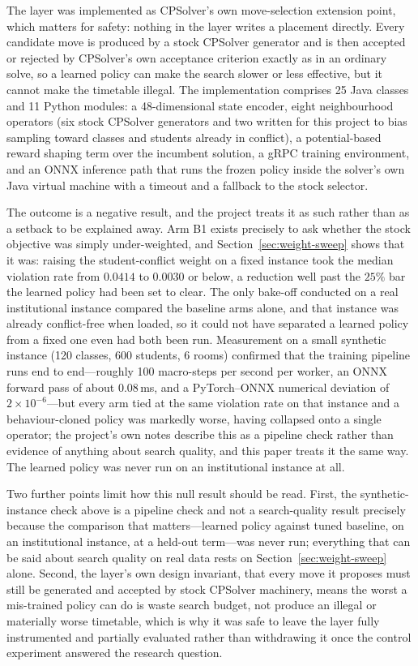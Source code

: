 \documentclass[journal]{IEEEtran}
\begin{document}
The layer was implemented as CPSolver's own move-selection extension point, which matters for safety: nothing in the layer writes a placement directly. Every candidate move is produced by a stock CPSolver generator and is then accepted or rejected by CPSolver's own acceptance criterion exactly as in an ordinary solve, so a learned policy can make the search slower or less effective, but it cannot make the timetable illegal. The implementation comprises 25 Java classes and 11 Python modules: a 48-dimensional state encoder, eight neighbourhood operators (six stock CPSolver generators and two written for this project to bias sampling toward classes and students already in conflict), a potential-based reward shaping term over the incumbent solution, a gRPC training environment, and an ONNX inference path that runs the frozen policy inside the solver's own Java virtual machine with a timeout and a fallback to the stock selector.

The outcome is a negative result, and the project treats it as such rather than as a setback to be explained away. Arm B1 exists precisely to ask whether the stock objective was simply under-weighted, and Section~\ref{sec:weight-sweep} shows that it was: raising the student-conflict weight on a fixed instance took the median violation rate from $0.0414$ to $0.0030$ or below, a reduction well past the $25\%$ bar the learned policy had been set to clear. The only bake-off conducted on a real institutional instance compared the baseline arms alone, and that instance was already conflict-free when loaded, so it could not have separated a learned policy from a fixed one even had both been run. Measurement on a small synthetic instance (120 classes, 600 students, 6 rooms) confirmed that the training pipeline runs end to end---roughly 100 macro-steps per second per worker, an ONNX forward pass of about 0.08\,ms, and a PyTorch--ONNX numerical deviation of $2\times10^{-6}$---but every arm tied at the same violation rate on that instance and a behaviour-cloned policy was markedly worse, having collapsed onto a single operator; the project's own notes describe this as a pipeline check rather than evidence of anything about search quality, and this paper treats it the same way. The learned policy was never run on an institutional instance at all.

Two further points limit how this null result should be read. First, the synthetic-instance check above is a pipeline check and not a search-quality result precisely because the comparison that matters---learned policy against tuned baseline, on an institutional instance, at a held-out term---was never run; everything that can be said about search quality on real data rests on Section~\ref{sec:weight-sweep} alone. Second, the layer's own design invariant, that every move it proposes must still be generated and accepted by stock CPSolver machinery, means the worst a mis-trained policy can do is waste search budget, not produce an illegal or materially worse timetable, which is why it was safe to leave the layer fully instrumented and partially evaluated rather than withdrawing it once the control experiment answered the research question.
\end{document}
